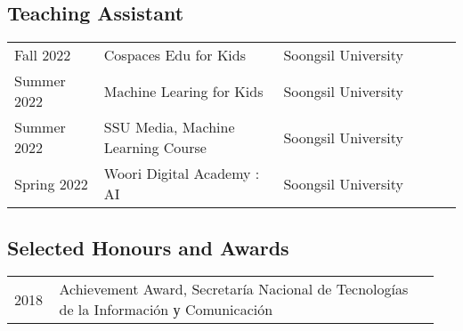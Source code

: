\documentclass[12pt,]{scrartcl}
\begin{document}
\subsection{Teaching Assistant}\label{teaching-assistant}

\begin{table}[!h]
{\def\arraystretch{1.5}\tabcolsep=0pt
\begin{tabular}{p{0.20\linewidth}p{0.40\linewidth}p{0.40\linewidth}}

  Fall 2022 & Cospaces Edu for Kids & Soongsil University \\
  
  Summer 2022 & Machine Learing for Kids & Soongsil University \\

  Summer 2022 & SSU Media, Machine Learning Course & Soongsil University \\

  Spring 2022 & Woori Digital Academy : AI & Soongsil University \\
  
\end{tabular}%
}
\end{table}



  


\subsection{Selected Honours and
Awards}\label{selected-honours-and-awards}

\begin{table}[!h]
{\def\arraystretch{1.5}\tabcolsep=0pt
\begin{tabular}{p{0.10\linewidth}p{0.85\linewidth}}

  2018 & Achievement Award, Secretaría Nacional de Tecnologías de la Información у Comunicación \\

\end{tabular}%
}
\end{table}
\end{document}

